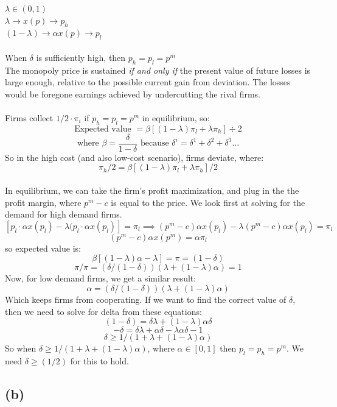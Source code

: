 \documentclass{article}
\begin{document}
$\lambda \in (0,1)$ \\
$\lambda \rightarrow x(p) \rightarrow p_h$ \\
$(1-\lambda) \rightarrow \alpha x(p) \rightarrow p_l$ \\
\\
When $\delta$ is sufficiently high, then $p_h = p_l = p^m$ \\
The monopoly price is sustained \textit{if and only if} the present value of future losses is large enough, relative to the possible current gain from deviation. The losses would be foregone earnings achieved by undercutting the rival firms. \\
\\
Firms collect $1/2 \cdot \pi_i$ if $p_h = p_l = p^m$ in equilibrium, so:
\[
\text{Expected value }= \beta[(1-\lambda)\pi_l + \lambda \pi_h] \div 2
\]
\[
\text{where } \beta = \frac{\delta}{1-\delta} \text{ because } \delta^i = \delta^1 + \delta^2 + \delta^3...
\]
So in the high cost (and also low-cost scenario), firms deviate, where: 
\[
\pi_h/2 = \beta[(1-\lambda)\pi_l + \lambda \pi_h]/2
\]
\\
In equilibrium, we can take the firm's profit maximization, and plug in the the profit margin, where $p^m - c$ is equal to the price. We look first at solving for the demand for high demand firms.
\[
[p_l\cdot \alpha x(p_l) - \lambda(p_l\cdot \alpha x(p_l)] = \pi_l \implies (p^m - c)\alpha x(p_l) - \lambda(p^m -c)\alpha x(p_l) = \pi_l
\]
\[
(p^m -c)\alpha x(p^m) = \alpha \pi_l
\]
so expected value is: 
\[
\beta[(1-\lambda)\alpha - \lambda] = \pi = (1-\delta)
\]
\[
\pi/\pi = (\delta/(1-\delta))(\lambda + (1-\lambda)\alpha) = 1
\]
Now, for low demand firms, we get a similar result:
\[
\alpha = (\delta/(1-\delta))(\lambda + (1-\lambda)\alpha)
\]
Which keeps firms from cooperating. If we want to find the correct value of $\delta$, then we need to solve for delta from these equations: 
\[
(1-\delta) = \delta\lambda + (1-\lambda)\alpha\delta
\]
\[
-\delta = \delta\lambda +\alpha\delta - \lambda\alpha\delta - 1
\]
\[
\delta \geq 1/(1 + \lambda + (1-\lambda)\alpha)
\]
So when $\delta \geq 1/(1 + \lambda + (1-\lambda)\alpha)$, where $\alpha \in [0,1]$ then $p_l = p_h = p^m$. We need $\delta \geq (1/2)$ for this to hold. 

\subsection*{(b)}
\end{document}
